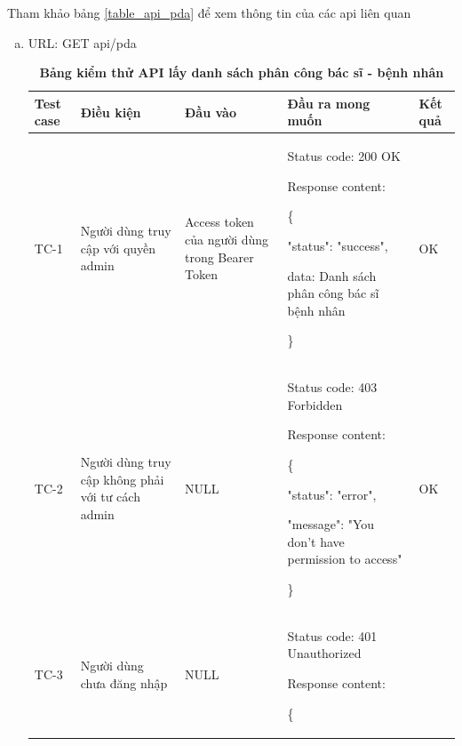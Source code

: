 Tham khảo bảng \ref{table_api_pda} để xem thông tin của các api liên quan

\begin{enumerate}[a)]
  \item URL: GET api/pda
    
  \begin{xltabular}{\textwidth}{
    | >{\raggedright\arraybackslash}p{1cm}
    | >{\raggedright\arraybackslash}p{2.5cm}
    | >{\raggedright\arraybackslash}p{2.5cm}
    | >{\raggedright\arraybackslash}X
    | >{\raggedright\arraybackslash}p{1cm}|
    }
    \caption{\bfseries \fontsize{12pt}{0pt}\selectfont Bảng kiểm thử API lấy danh sách phân công bác sĩ - bệnh nhân}
    \\
    \hline
    \bfseries Test case    &\bfseries Điều kiện   &\bfseries Đầu vào 
    &\bfseries Đầu ra mong muốn &\bfseries Kết quả\\ \hline
  
  
    TC-1
    & Người dùng truy cập với quyền admin
    & Access token của người dùng trong Bearer Token
  
    & 
  
    Status code: 200 OK
  
      Response content:
  
      \{
  
    "status": "success",
  
    data: Danh sách phân công bác sĩ bệnh nhân 
  
    \}
    & OK
  
    \\ \hline
  
    TC-2
    & Người dùng truy cập không phải với tư cách admin
    & NULL
  
    & 
  
    Status code: 403 Forbidden
  
    Response content:

    \{

  "status": "error",

  "message": "You don't have permission to access"

  \}
    & OK
    \\ \hline
    TC-3
    & Người dùng chưa đăng nhập
    & NULL
  
    & 
  
    Status code: 401 Unauthorized
  
      Response content:
  
      \{
  

\end{xltabular}
\end{enumerate}
